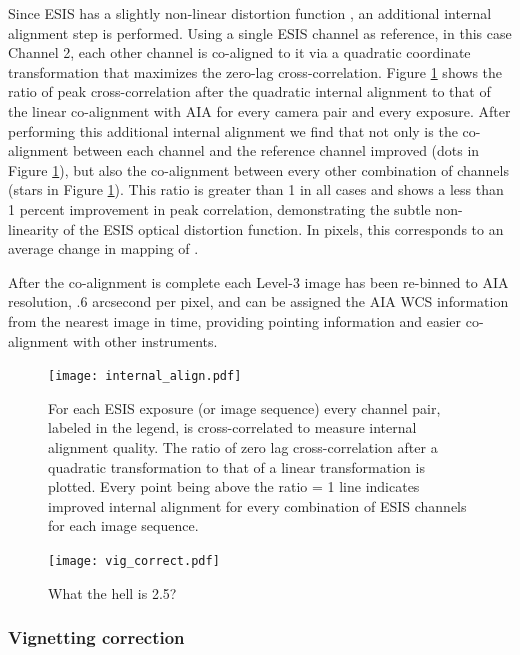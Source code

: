     	Since ESIS has a slightly non-linear distortion function \citep{ESIS}, an additional internal alignment step is performed.
    	Using a single ESIS channel as reference, in this case Channel 2, each other channel is co-aligned to it via a quadratic coordinate transformation that maximizes the zero-lag cross-correlation. 
    	Figure \ref{fig:cc} shows the ratio of peak cross-correlation after the quadratic internal alignment to that of the linear co-alignment with AIA for every camera pair and every exposure.
    	After performing this additional internal alignment we find that not only is the co-alignment between each channel and the reference channel improved (dots in Figure \ref{fig:cc}), but also the co-alignment between every other combination of channels (stars in Figure \ref{fig:cc}).
    	This ratio is greater than 1 in all cases and shows a less than 1 percent improvement in peak correlation, demonstrating the subtle non-linearity of the ESIS optical distortion function.
    	In pixels, this corresponds to an average change in mapping of .
    	
        After the co-alignment is complete each Level-3 image has been re-binned to AIA resolution, .6 arcsecond per pixel, and can be assigned the AIA WCS information from the nearest image in time, providing pointing information and easier co-alignment with other instruments.
    	

    	
     	\begin{figure}[htb!]
    		\centering
    		\texttt{[image: internal\_align.pdf]}
    		\caption{For each ESIS exposure (or image sequence) every channel pair, labeled in the legend, is cross-correlated to measure internal alignment quality.  The ratio of zero lag cross-correlation after a quadratic transformation to that of a linear transformation is plotted.  Every point being above the ratio = 1 line indicates improved internal alignment for every combination of ESIS channels for each image sequence.}
    		\label{fig:cc}	
    	\end{figure}
    	
 		\begin{figure}[htb!]
			\centering
			\texttt{[image: vig\_correct.pdf]}
			\caption{What the hell is 2.5?}
			\label{fig:vig_correct}
		\end{figure}

    \subsubsection{Vignetting correction}
  
